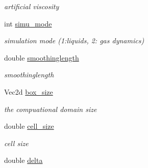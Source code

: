 \begin{CompactItemize}
\begin{CompactList}\small\item\em artificial viscosity \item\end{CompactList}\item 
\hypertarget{classInitiation_db9ebb73d2d6e17bb8e0179d29abaf7b}{
int \hyperlink{classInitiation_db9ebb73d2d6e17bb8e0179d29abaf7b}{simu\_\-mode}}
\label{classInitiation_db9ebb73d2d6e17bb8e0179d29abaf7b}

\begin{CompactList}\small\item\em simulation mode (1:liquids, 2: gas dynamics) \item\end{CompactList}\item 
\hypertarget{classInitiation_7053a11a810568d6beb69ed19bc7fa59}{
double \hyperlink{classInitiation_7053a11a810568d6beb69ed19bc7fa59}{smoothinglength}}
\label{classInitiation_7053a11a810568d6beb69ed19bc7fa59}

\begin{CompactList}\small\item\em smoothinglength \item\end{CompactList}\item 
\hypertarget{classInitiation_c4ab38f327f64513f4c21cd5781f508a}{
Vec2d \hyperlink{classInitiation_c4ab38f327f64513f4c21cd5781f508a}{box\_\-size}}
\label{classInitiation_c4ab38f327f64513f4c21cd5781f508a}

\begin{CompactList}\small\item\em the compuational domain size \item\end{CompactList}\item 
\hypertarget{classInitiation_ed9ecf2c5296af4ac243b1a089966c86}{
double \hyperlink{classInitiation_ed9ecf2c5296af4ac243b1a089966c86}{cell\_\-size}}
\label{classInitiation_ed9ecf2c5296af4ac243b1a089966c86}

\begin{CompactList}\small\item\em cell size \item\end{CompactList}\item 
\hypertarget{classInitiation_300dc1f911e95df0ecf34179bf1931fa}{
double \hyperlink{classInitiation_300dc1f911e95df0ecf34179bf1931fa}{delta}}
\label{classInitiation_300dc1f911e95df0ecf34179bf1931fa}


\end{CompactItemize}
